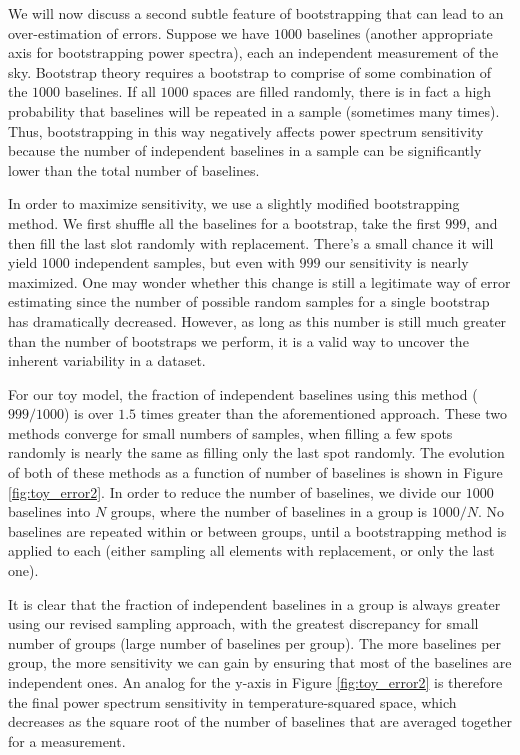 \documentclass[preprint2,numberedappendix,tighten,twocolappendix]{aastex6}  %
\begin{document}
We will now discuss a second subtle feature of bootstrapping that can lead to an over-estimation of errors. Suppose we have $1000$ baselines (another appropriate axis for bootstrapping power spectra), each an independent measurement of the sky. Bootstrap theory requires a bootstrap to comprise of some combination of the $1000$ baselines. If all $1000$ spaces are filled randomly, there is in fact a high probability that baselines will be repeated in a sample (sometimes many times). Thus, bootstrapping in this way negatively affects power spectrum sensitivity because the number of independent baselines in a sample can be significantly lower than the total number of baselines.

In order to maximize sensitivity, we use a slightly modified bootstrapping method. We first shuffle all the baselines for a bootstrap, take the first $999$, and then fill the last slot randomly with replacement. There's a small chance it will yield $1000$ independent samples, but even with $999$ our sensitivity is nearly maximized. One may wonder whether this change is still a legitimate way of error estimating since the number of possible random samples for a single bootstrap has dramatically decreased. However, as long as this number is still much greater than the number of bootstraps we perform, it is a valid way to uncover the inherent variability in a dataset. 

For our toy model, the fraction of independent baselines using this method ($999/1000$) is over $1.5$ times greater than the aforementioned approach. These two methods converge for small numbers of samples, when filling a few spots randomly is nearly the same as filling only the last spot randomly. The evolution of both of these methods as a function of number of baselines is shown in Figure \ref{fig:toy_error2}. In order to reduce the number of baselines, we divide our $1000$ baselines into $N$ groups, where the number of baselines in a group is $1000/N$. No baselines are repeated within or between groups, until a bootstrapping method is applied to each (either sampling all elements with replacement, or only the last one).

It is clear that the fraction of independent baselines in a group is always greater using our revised sampling approach, with the greatest discrepancy for small number of groups (large number of baselines per group). The more baselines per group, the more sensitivity we can gain by ensuring that most of the baselines are independent ones. An analog for the y-axis in Figure \ref{fig:toy_error2} is therefore the final power spectrum sensitivity in temperature-squared space, which decreases as the square root of the number of baselines that are averaged together for a measurement.
\end{document}
